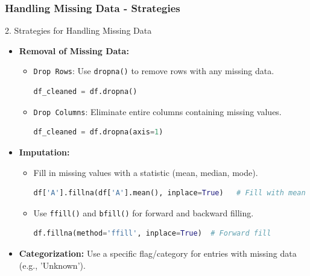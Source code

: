 \documentclass{beamer}
\begin{document}
\begin{frame}[fragile]
    \frametitle{Handling Missing Data - Strategies}
    \begin{block}{2. Strategies for Handling Missing Data}
        \begin{itemize}
            \item \textbf{Removal of Missing Data:}
            \begin{itemize}
                \item \texttt{Drop Rows}: Use \texttt{dropna()} to remove rows with any missing data.
                \begin{lstlisting}[language=Python]
df_cleaned = df.dropna()
                \end{lstlisting}
                
                \item \texttt{Drop Columns}: Eliminate entire columns containing missing values.
                \begin{lstlisting}[language=Python]
df_cleaned = df.dropna(axis=1)
                \end{lstlisting}
            \end{itemize}

            \item \textbf{Imputation:}
            \begin{itemize}
                \item Fill in missing values with a statistic (mean, median, mode).
                \begin{lstlisting}[language=Python]
df['A'].fillna(df['A'].mean(), inplace=True)   # Fill with mean
                \end{lstlisting}
                
                \item Use \texttt{ffill()} and \texttt{bfill()} for forward and backward filling.
                \begin{lstlisting}[language=Python]
df.fillna(method='ffill', inplace=True)  # Forward fill
                \end{lstlisting}
            \end{itemize}

            \item \textbf{Categorization:}
                Use a specific flag/category for entries with missing data (e.g., 'Unknown').
        \end{itemize}
    \end{block}
\end{frame}
\end{document}
